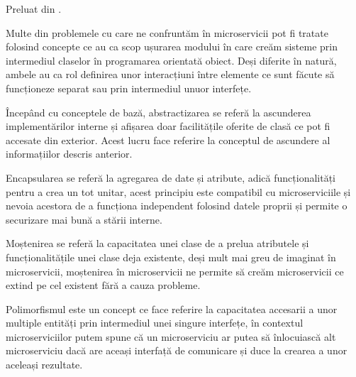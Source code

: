Preluat din \cite{temasolid}.

Multe din problemele cu care ne confruntăm în microservicii pot fi tratate folosind concepte
ce au ca scop ușurarea modului în care creăm sisteme prin intermediul claselor în programarea 
orientată obiect. Deși diferite în natură, ambele au ca rol definirea unor interacțiuni între
elemente ce sunt făcute să funcționeze separat sau prin intermediul unuor interfețe.

Începând cu conceptele de bază, abstractizarea se referă la ascunderea implementărilor interne
și afișarea doar facilitățile oferite de clasă ce pot fi accesate din exterior. Acest lucru face 
referire la conceptul de ascundere al informațiilor descris anterior.

Encapsularea se referă la agregarea de date și atribute, adică funcționalități pentru a crea un tot
unitar, acest principiu este compatibil cu microserviciile și nevoia acestora de a funcționa
independent folosind datele proprii și permite o securizare mai bună a stării interne.

Moștenirea se referă la capacitatea unei clase de a prelua atributele și funcționalitățile unei clase
deja existente, deși mult mai greu de imaginat în microservicii, moștenirea în microservicii ne permite
să creăm microservicii ce extind pe cel existent fără a cauza probleme.

Polimorfismul este un concept ce face referire la capacitatea accesarii a unor multiple entități
prin intermediul unei singure interfețe, în contextul microserviciilor putem spune că un microserviciu
ar putea să înlocuiască alt microserviciu dacă are aceași interfață de comunicare și duce la
crearea a unor aceleași rezultate.


